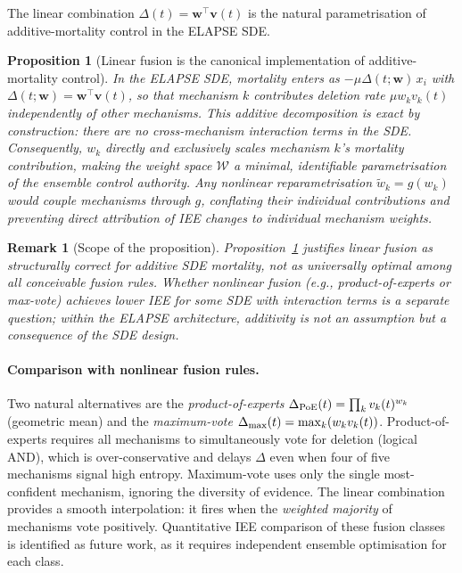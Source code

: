 \documentclass[review,12pt]{elsarticle}
\newcommand{\bfw}{\mathbf{w}}
\newcommand{\bfv}{\mathbf{v}}
\newtheorem{proposition}{Proposition}
\newtheorem{remark}{Remark}
\begin{document}
The linear combination $\Delta(t) = \bfw^\top\bfv(t)$ is the natural
parametrisation of additive-mortality control in the ELAPSE SDE.

\begin{proposition}[Linear fusion is the canonical implementation of additive-mortality control]
\label{prop:fusion}
In the ELAPSE SDE, mortality enters as $-\mu\Delta(t;\bfw)\,x_i$ with
$\Delta(t;\bfw) = \bfw^\top\bfv(t)$, so that mechanism $k$ contributes
deletion rate $\mu w_k v_k(t)$ independently of other mechanisms.
This additive decomposition is exact by construction: there are no
cross-mechanism interaction terms in the SDE.  Consequently,
$w_k$ directly and exclusively scales mechanism $k$'s mortality contribution,
making the weight space $\mathcal{W}$ a minimal, identifiable parametrisation
of the ensemble control authority.  Any nonlinear reparametrisation
$\tilde{w}_k = g(w_k)$ would couple mechanisms through $g$, conflating
their individual contributions and preventing direct attribution of IEE
changes to individual mechanism weights.
\end{proposition}

\begin{remark}[Scope of the proposition]
Proposition~\ref{prop:fusion} justifies linear fusion as \emph{structurally
correct} for additive SDE mortality, not as universally optimal among all
conceivable fusion rules.  Whether nonlinear fusion (e.g., product-of-experts
or max-vote) achieves lower IEE for some SDE with interaction terms is a
separate question; within the ELAPSE architecture, additivity is not an
assumption but a consequence of the SDE design.
\end{remark}

\paragraph{Comparison with nonlinear fusion rules.}
Two natural alternatives are the \emph{product-of-experts}
$\Delta_{\rm PoE}(t) = \prod_k v_k(t)^{w_k}$
(geometric mean) and the \emph{maximum-vote}
$\Delta_{\rm max}(t) = \max_k (w_k v_k(t))$.
Product-of-experts requires all mechanisms to simultaneously vote for deletion
(logical AND), which is over-conservative and delays $\Delta$ even when four
of five mechanisms signal high entropy.  Maximum-vote uses only the single
most-confident mechanism, ignoring the diversity of evidence.  The linear
combination provides a smooth interpolation: it fires when the
\emph{weighted majority} of mechanisms vote positively.
Quantitative IEE comparison of these fusion classes is identified as future work,
as it requires independent ensemble optimisation for each class.
\end{document}
